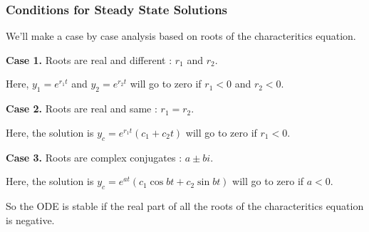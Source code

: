 \subsubsection{Conditions for Steady State Solutions}

We'll make a case by case analysis based on roots of the characteritics equation.

{\bf Case 1. } Roots are real and different : $r_1$ and $r_2$.

Here, $y_1 = e^{r_1 t}$ and $y_2 = e^{r_2 t}$ will go to zero if $r_1 < 0$ and $r_2 < 0$.

{\bf Case 2. } Roots are real and same : $r_1 = r_2$.

Here, the solution is $y_c = e^{r_1 t}(c_1 + c_2 t)$ will go to zero if $r_1 < 0$.

{\bf Case 3. } Roots are complex conjugates : $a \pm bi$.

Here, the solution is $y_c = e^{at}(c_1 \cos bt + c_2 \sin bt)$ will go to zero if $a < 0$. 

So the ODE is stable if the real part of all the roots of the characteritics equation is negative.